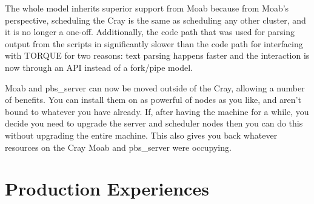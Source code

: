 \documentclass[10pt, conference, compsocconf]{IEEEtran}
\begin{document}
The whole model inherits superior support from Moab because from Moab's perspective, scheduling 
the Cray is the same as scheduling any other cluster, and it is no longer a one-off. Additionally,
the code path that was used for parsing output from the scripts in significantly slower than the 
code path for interfacing with TORQUE for two reasons: text parsing happens faster and the interaction
is now through an API instead of a fork/pipe model.

Moab and pbs_server can now be moved outside of the Cray, allowing a number of benefits. You can
install them on as powerful of nodes as you like, and aren't bound to whatever you have already.
If, after having the machine for a while, you decide you need to upgrade the server and scheduler
nodes then you can do this without upgrading the entire machine. This also gives you back whatever
resources on the Cray Moab and pbs_server were occupying. 

\section{Production Experiences}














\end{document}
